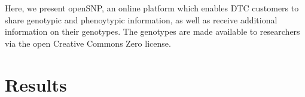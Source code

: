 \documentclass[10pt]{article}
\begin{document}
Here, we present 
openSNP, an online platform which enables DTC customers to share genotypic and phenoytypic information, as well as receive additional information on their genotypes. The genotypes are made available to researchers via the open Creative Commons Zero license.

\section*{Results}
%
%
%
\end{document}

